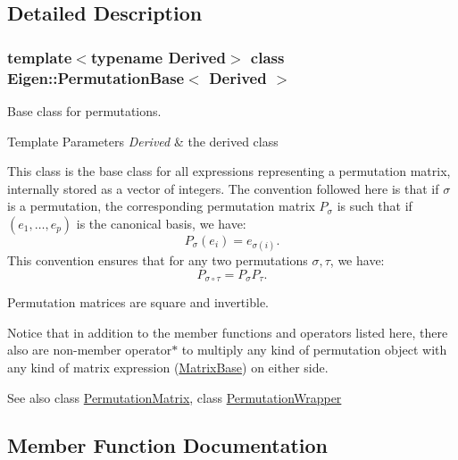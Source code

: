 \subsection{Detailed Description}
\subsubsection*{template$<$typename Derived$>$\newline
class Eigen\+::\+Permutation\+Base$<$ Derived $>$}

Base class for permutations. 


\begin{DoxyTemplParams}{Template Parameters}
{\em Derived} & the derived class\\
\hline
\end{DoxyTemplParams}
This class is the base class for all expressions representing a permutation matrix, internally stored as a vector of integers. The convention followed here is that if $ \sigma $ is a permutation, the corresponding permutation matrix $ P_\sigma $ is such that if $ (e_1,\ldots,e_p) $ is the canonical basis, we have\+: \[ P_\sigma(e_i) = e_{\sigma(i)}. \] This convention ensures that for any two permutations $ \sigma, \tau $, we have\+: \[ P_{\sigma\circ\tau} = P_\sigma P_\tau. \]

Permutation matrices are square and invertible.

Notice that in addition to the member functions and operators listed here, there also are non-\/member operator$\ast$ to multiply any kind of permutation object with any kind of matrix expression (\mbox{\hyperlink{class_eigen_1_1_matrix_base}{Matrix\+Base}}) on either side.

\begin{DoxySeeAlso}{See also}
class \mbox{\hyperlink{class_eigen_1_1_permutation_matrix}{Permutation\+Matrix}}, class \mbox{\hyperlink{class_eigen_1_1_permutation_wrapper}{Permutation\+Wrapper}} 
\end{DoxySeeAlso}


\subsection{Member Function Documentation}
\mbox{\label{class_eigen_1_1_permutation_base_a4e3455bf12b56123e38a8220c6b508dc}} 
